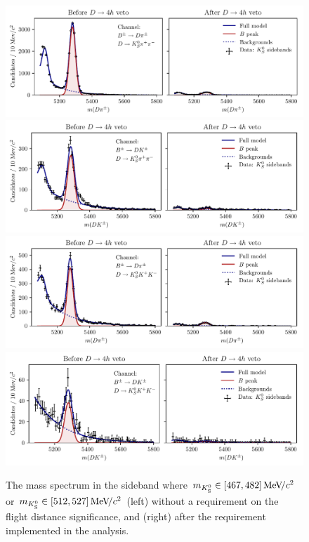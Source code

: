 \begin{figure}[tbp]
    \centering
    \includegraphics[width=0.95\columnwidth]{figures/analysis/background_checks/ks_fd_check_Pi_PiPi.pdf}
    \includegraphics[width=0.95\columnwidth]{figures/analysis/background_checks/ks_fd_check_K_PiPi.pdf}
    \includegraphics[width=0.95\columnwidth]{figures/analysis/background_checks/ks_fd_check_Pi_KK.pdf}
    \includegraphics[width=0.95\columnwidth]{figures/analysis/background_checks/ks_fd_check_K_KK.pdf}
    \caption{The \B mass spectrum in the \KS sideband where $m_{{K}^0_{\mathrm{S}}}\in[467, 482]\text{\,Me\kern -0.1em V\!/}c^2$ or $m_{{K}^0_{\mathrm{S}}}\in[512,527]\text{\,Me\kern -0.1em V\!/}c^2$ (left) without a requirement on the \KS flight distance significance, and (right) after the requirement implemented in the analysis.}
    \label{fig:fake_ks}
\end{figure}

